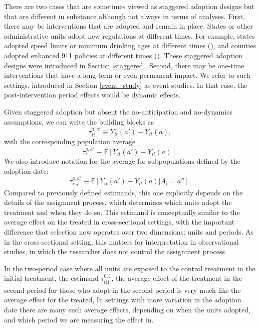 \documentclass[letterpaper,12pt,leqno]{article}
\newcommand{\mme}{{\mathbb{E}}}
\begin{document}
There are two cases that are sometimes viewed as staggered adoption designs but that are  different in substance although not always in terms of analyses. First, there may be interventions that are adopted and remain in place. States or other administrative units adopt new regulations at different times. For example, states adopted speed limits or minimum drinking ages at different times (\citealp{ashenfelter2004using}), and counties adopted enhanced 911 policies at different times (\citealp{athey2002impact}). 
These staggered adoption designs were introduced in Section \ref{staggered}.
Second, there may be one-time interventions that have a long-term or even permanent impact. We refer to such settings, introduced in Section \ref{event_study} as event studies. In that case, the post-intervention period effects would be dynamic effects.


Given staggered adoption but absent the no-anticipation  and no-dynamics assumptions, we can write the building blocks as
\begin{equation}\label{eq:athey_imbens}
\tau^{a,a'}_{it}\equiv Y_{it}(a') -Y_{it}(a),
    \end{equation}
with the corresponding population average
\[ \tau^{a,a'}_{t}\equiv \mme\left[ Y_{it}(a') -Y_{it}(a)\right].
\]
We also introduce notation for the average for subpopulations defined by the adoption date:
\[ \tau^{a,a'}_{t|a''}\equiv\mme\left[Y_{it}(a') -Y_{it}(a)|A_i = a''\right].\] 
Compared to previously defined estimands, this one explicitly depends on the details of the assignment process, which determines which units adopt the treatment and when they do so. This estimand is conceptually similar to the average effect on the treated in cross-sectional settings, with the important difference that selection now operates over two dimensions: units and periods. As in the cross-sectional setting, this matters for interpretation in observational studies, in which the researcher does not control the assignment process.

In the two-period case where all units are exposed to the control treatment in the initial treatment, the estimand $ \tau^{0,1}_{t|1}$, the average effect of the treatment in the second period for those who adopt in the second period is very much like the average effect for the treated, In settings with more variation in the adoption date there are many such average effects, depending on when the units adopted, and which period we are measuring the effect in.
\end{document}

